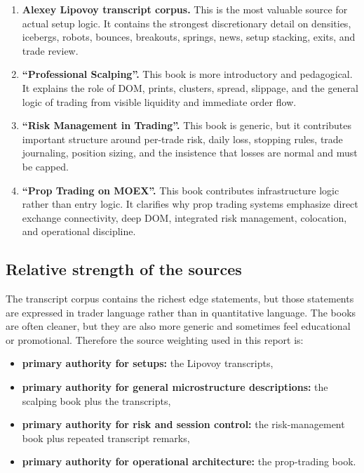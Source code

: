 \begin{enumerate}
\item \textbf{Alexey Lipovoy transcript corpus.} This is the most valuable source for actual setup logic. It contains the strongest discretionary detail on densities, icebergs, robots, bounces, breakouts, springs, news, setup stacking, exits, and trade review.
\item \textbf{``Professional Scalping''.} This book is more introductory and pedagogical. It explains the role of DOM, prints, clusters, spread, slippage, and the general logic of trading from visible liquidity and immediate order flow.
\item \textbf{``Risk Management in Trading''.} This book is generic, but it contributes important structure around per-trade risk, daily loss, stopping rules, trade journaling, position sizing, and the insistence that losses are normal and must be capped.
\item \textbf{``Prop Trading on MOEX''.} This book contributes infrastructure logic rather than entry logic. It clarifies why prop trading systems emphasize direct exchange connectivity, deep DOM, integrated risk management, colocation, and operational discipline.
\end{enumerate}

\subsection{Relative strength of the sources}

The transcript corpus contains the richest edge statements, but those statements are expressed in trader language rather than in quantitative language. The books are often cleaner, but they are also more generic and sometimes feel educational or promotional. Therefore the source weighting used in this report is:

\begin{itemize}
\item \textbf{primary authority for setups:} the Lipovoy transcripts,
\item \textbf{primary authority for general microstructure descriptions:} the scalping book plus the transcripts,
\item \textbf{primary authority for risk and session control:} the risk-management book plus repeated transcript remarks,
\item \textbf{primary authority for operational architecture:} the prop-trading book.
\end{itemize}

